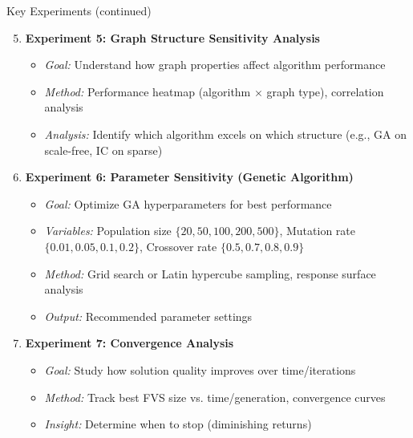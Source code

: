 \documentclass[aspectratio=169]{beamer}
\begin{document}
\begin{frame}{Key Experiments (continued)}
	\begin{enumerate}
		\setcounter{enumi}{4}
		\item \textbf{Experiment 5: Graph Structure Sensitivity Analysis}
		      \begin{itemize}
			      \scriptsize
			      \item \textit{Goal:} Understand how graph properties affect algorithm performance
			      \item \textit{Method:} Performance heatmap (algorithm $\times$ graph type), correlation analysis
			      \item \textit{Analysis:} Identify which algorithm excels on which structure (e.g., GA on scale-free, IC on sparse)
		      \end{itemize}

		      \vspace{0.2cm}
		\item \textbf{Experiment 6: Parameter Sensitivity (Genetic Algorithm)}
		      \begin{itemize}
			      \scriptsize
			      \item \textit{Goal:} Optimize GA hyperparameters for best performance
			      \item \textit{Variables:} Population size $\{20, 50, 100, 200, 500\}$, Mutation rate $\{0.01, 0.05, 0.1, 0.2\}$, Crossover rate $\{0.5, 0.7, 0.8, 0.9\}$
			      \item \textit{Method:} Grid search or Latin hypercube sampling, response surface analysis
			      \item \textit{Output:} Recommended parameter settings
		      \end{itemize}

		      \vspace{0.2cm}
		\item \textbf{Experiment 7: Convergence Analysis}
		      \begin{itemize}
			      \scriptsize
			      \item \textit{Goal:} Study how solution quality improves over time/iterations
			      \item \textit{Method:} Track best FVS size vs. time/generation, convergence curves
			      \item \textit{Insight:} Determine when to stop (diminishing returns)
		      \end{itemize}


\end{enumerate}
\end{frame}
\end{document}
